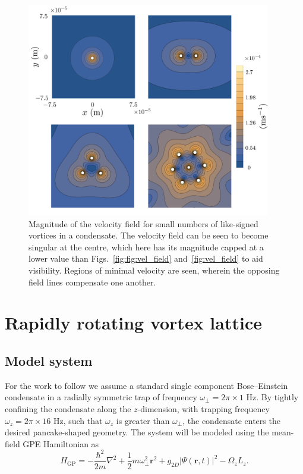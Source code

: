 \begin{figure}\centering
    \includegraphics[width=0.95\textwidth]{Images/ch4_vtx/velocity/vel}
    \caption{Magnitude of the velocity field for small numbers of like-signed vortices in a condensate. The velocity field can be seen to become singular at the centre, which here has its magnitude capped at a lower value than Figs.~\ref{fig:fig:vel_field} and~\ref{fig:vel_field} to aid visibility. Regions of minimal velocity are seen, wherein the opposing field lines compensate one another.}
    \label{fig:vel_pm_contour}
\end{figure}


\section{Rapidly rotating vortex lattice}

\subsection{Model system}\label{sec:modelsystem}
For the work to follow we assume a standard single component Bose--Einstein condensate in a radially symmetric trap of frequency $\omega_\perp = 2\pi \times 1$ Hz. By tightly confining the condensate along the $z$-dimension, with trapping frequency $\omega_z = 2\pi\times 16$ Hz, such that $\omega_z $ is greater than $ \omega_\perp$, the condensate enters the desired pancake-shaped geometry. The system will be modeled using the mean-field GPE Hamiltonian as
\begin{equation}\label{eqn:gpe_h0}
	H_{\mathrm{GP}} = -\frac{\hbar^2}{2m}\nabla^2 + \frac{1}{2}m\omega_{\perp}^2\mathbf{r}^2 + g_{2D}\vert\Psi(\mathbf{r},t)\vert^2 - \Omega_z L_z.
\end{equation}

